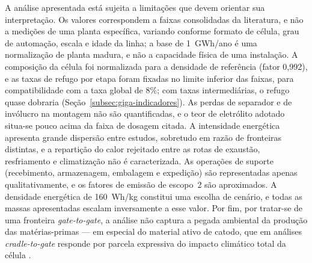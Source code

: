A análise apresentada está sujeita a limitações que devem orientar sua
interpretação. Os valores correspondem a faixas consolidadas da literatura, e não
a medições de uma planta específica, variando conforme formato de célula, grau de
automação, escala e idade da linha; a base de 1~GWh/ano é uma normalização de
planta madura, e não a capacidade física de uma instalação. A composição da
célula foi normalizada para a densidade de referência (fator 0,992), e as taxas de
refugo por etapa foram fixadas no limite inferior das faixas, para compatibilidade
com a taxa global de 8\%; com taxas intermediárias, o refugo quase dobraria
(Seção~\ref{subsec:giga-indicadores}). As perdas de separador e de invólucro na
montagem não são quantificadas, e o teor de eletrólito adotado situa-se pouco
acima da faixa de dosagem citada. A intensidade energética apresenta grande
dispersão entre estudos, sobretudo em razão de fronteiras distintas, e a
repartição do calor rejeitado entre as rotas de exaustão, resfriamento e
climatização não é caracterizada. As operações de suporte (recebimento,
armazenagem, embalagem e expedição) são representadas apenas qualitativamente, e
os fatores de emissão de escopo~2 são aproximados. A densidade energética de
160~Wh/kg constitui uma escolha de cenário, e todas as massas apresentadas escalam
inversamente a esse valor. Por fim, por tratar-se de uma fronteira
\textit{gate-to-gate}, a análise não captura a pegada ambiental da produção das
matérias-primas — em especial do material ativo de catodo, que em análises
\textit{cradle-to-gate} responde por parcela expressiva do impacto climático total
da célula \cite{dai2019}.
